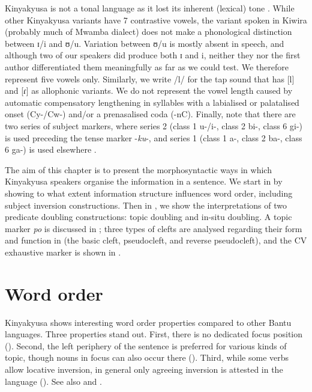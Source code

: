 \documentclass[output=paper]{langscibook}
\begin{document}
Kinyakyusa is not a tonal language as it lost its inherent (lexical) tone \citep[38]{Persohn2020}. While other Kinyakyusa variants have 7 contrastive vowels, the variant spoken in Kiwira (probably much of Mwamba dialect) does not make a phonological distinction between ɪ/i and ʊ/u. Variation between ʊ/u is mostly absent in speech, and although two of our speakers did produce both ɪ and i, neither they nor the first author differentiated them meaningfully as far as we could test. We therefore represent five vowels only. Similarly, we write /l/ for the tap sound that has [l] and [ɾ] as allophonic variants. We do not represent the vowel length caused by automatic compensatory lengthening in syllables with a labialised or palatalised onset (Cy-/Cw-) and/or a prenasalised coda (-nC). Finally, note that there are two series of subject markers, where series 2 (class 1 u-/i-, class 2 bi-, class 6 gi-) is used preceding the tense marker -\textit{ku}-, and series 1 (class 1 a-, class 2 ba-, class 6 ga-) is used elsewhere \citep[see][3]{Persohn2020}.

The aim of this chapter is to present the morphosyntactic ways in which Kinyakyusa speakers organise the information in a sentence. We start in  by showing to what extent information structure influences word order, including subject inversion constructions. Then in , we show the interpretations of two predicate doubling constructions: topic doubling and in-situ doubling. A topic marker \textit{po} is discussed in ; three types of clefts are analysed regarding their form and function in  (the basic cleft, pseudocleft, and reverse pseudocleft), and the CV exhaustive marker is shown in . 

\section{Word order}
\label{bkm:Ref136514368}
Kinyakyusa shows interesting word order properties compared to other Bantu languages. Three properties stand out. First, there is no dedicated focus position (){.} Second, the left periphery of the sentence is preferred for various kinds of topic, though nouns in focus can also occur there (). Third, while some verbs allow locative inversion, in general only agreeing inversion is attested in the language (). See also \citet{KerrEtAl2023} and \citet{MsovelaEtAl2023}.
\end{document}
